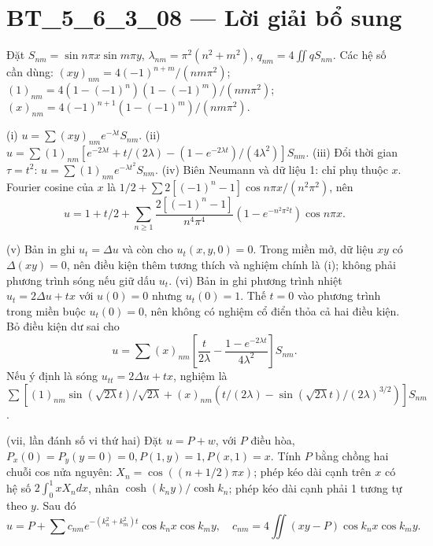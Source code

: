 \documentclass[10pt,a4paper]{article}
\begin{document}
\section*{BT\_5\_6\_3\_08 — Lời giải bổ sung}
Đặt $S_{nm}=\sin n\pi x\sin m\pi y$, $\lambda_{nm}=\pi^2(n^2+m^2)$, $q_{nm}=4\iint qS_{nm}$. Các hệ số cần dùng: $(xy)_{nm}=4(-1)^{n+m}/(nm\pi^2)$; $(1)_{nm}=4(1-(-1)^n)(1-(-1)^m)/(nm\pi^2)$; $(x)_{nm}=4(-1)^{n+1}(1-(-1)^m)/(nm\pi^2)$.

(i) $u=\sum(xy)_{nm}e^{-\lambda t}S_{nm}$.
(ii) $u=\sum(1)_{nm}[e^{-2\lambda t}+t/(2\lambda)-(1-e^{-2\lambda t})/(4\lambda^2)]S_{nm}$.
(iii) Đổi thời gian $\tau=t^2$: $u=\sum(1)_{nm}e^{-\lambda t^2}S_{nm}$.
(iv) Biên Neumann và dữ liệu 1: chỉ phụ thuộc $x$. Fourier cosine của $x$ là $1/2+\sum 2[(-1)^n-1]\cos n\pi x/(n^2\pi^2)$, nên
\[u=1+t/2+\sum_{n\ge1}\frac{2[(-1)^n-1]}{n^4\pi^4}(1-e^{-n^2\pi^2t})\cos n\pi x.\]

(v) Bản in ghi $u_t=\Delta u$ và còn cho $u_t(x,y,0)=0$. Trong miền mở, dữ liệu $xy$ có $\Delta(xy)=0$, nên điều kiện thêm tương thích và nghiệm chính là (i); không phải phương trình sóng nếu giữ dấu $u_t$.
(vi) Bản in ghi phương trình nhiệt $u_t=2\Delta u+tx$ với $u(0)=0$ nhưng $u_t(0)=1$. Thế $t=0$ vào phương trình trong miền buộc $u_t(0)=0$, nên không có nghiệm cổ điển thỏa cả hai điều kiện. Bỏ điều kiện dư sai cho
\[u=\sum(x)_{nm}\left[\frac t{2\lambda}-\frac{1-e^{-2\lambda t}}{4\lambda^2}\right]S_{nm}.\]
Nếu ý định là sóng $u_{tt}=2\Delta u+tx$, nghiệm là $\sum[(1)_{nm}\sin(\sqrt{2\lambda}t)/\sqrt{2\lambda}+(x)_{nm}(t/(2\lambda)-\sin(\sqrt{2\lambda}t)/(2\lambda)^{3/2})]S_{nm}$.

(vii, lần đánh số vi thứ hai) Đặt $u=P+w$, với $P$ điều hòa, $P_x(0)=P_y(y=0)=0,P(1,y)=1,P(x,1)=x$. Tính $P$ bằng chồng hai chuỗi cos nửa nguyên: $X_n=\cos((n+1/2)\pi x)$; phép kéo dài cạnh trên $x$ có hệ số $2\int_0^1xX_n dx$, nhân $\cosh(k_ny)/\cosh k_n$; phép kéo dài cạnh phải 1 tương tự theo $y$. Sau đó
\[u=P+\sum c_{nm}e^{-(k_n^2+k_m^2)t}\cos k_nx\cos k_my,\quad c_{nm}=4\iint(xy-P)\cos k_nx\cos k_my.\]
\end{document}
